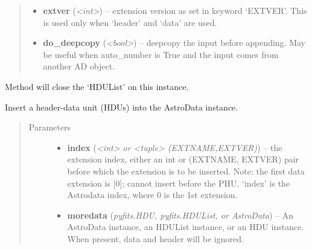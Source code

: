 \documentclass[letterpaper,10pt,english]{sphinxmanual}
\begin{document}
\begin{fulllineitems}
\begin{fulllineitems}
\begin{quote}
\begin{description}
\begin{itemize}
\item {} 
\textbf{extver} (\emph{\textless{}int\textgreater{}}) -- extension version as set in keyword `EXTVER'. This is 
used only when `header' and `data' are used.

\item {} 
\textbf{do\_deepcopy} (\emph{\textless{}bool\textgreater{}}) -- deepcopy the input before appending. May be useful
when auto\_number is True and the input comes from 
another AD object.

\end{itemize}

\end{description}\end{quote}

\end{fulllineitems}


\begin{fulllineitems}
\label{astro_class:astrodata.AstroData.AstroData.close}
Method will close the `HDUList' on this instance.

\end{fulllineitems}


\begin{fulllineitems}
\label{astro_class:astrodata.AstroData.AstroData.insert}
Insert a header-data unit (HDUs) into the AstroData instance.
\begin{quote}\begin{description}
\item[{Parameters}] \leavevmode\begin{itemize}
\item {} 
\textbf{index} (\emph{\textless{}int\textgreater{} or \textless{}tuple\textgreater{} (EXTNAME,EXTVER)}) -- the extension index, either an int or (EXTNAME, EXTVER)
pair before which the extension is to be inserted.
Note: the first data extension is {[}0{]}; cannot insert
before the PHU. `index' is the  Astrodata index, where
0 is the 1st extension.

\item {} 
\textbf{moredata} (\emph{pyfits.HDU, pyfits.HDUList, or AstroData}) -- An AstroData instance, an HDUList instance, or
an HDU instance. When present, data and header will be
ignored.


\end{itemize}
\end{description}
\end{quote}
\end{fulllineitems}
\end{fulllineitems}
\end{document}
